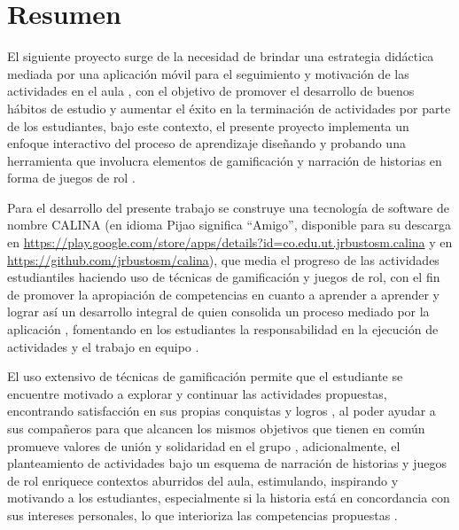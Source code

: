 \section*{Resumen}

\begin{singlespace}
El siguiente proyecto surge de la necesidad de brindar una estrategia didáctica mediada por una aplicación 
móvil para el seguimiento y motivación de las actividades en el aula \cite{SAILER2017371, DAROCHASEIXAS201648}, 
con el objetivo de promover el desarrollo de buenos hábitos de estudio y aumentar el éxito en la terminación 
de actividades por parte de los estudiantes, bajo este contexto, el presente proyecto implementa un enfoque 
interactivo del proceso de aprendizaje diseñando y probando una herramienta que involucra elementos de 
gamificación y narración de historias en forma de juegos de rol \cite{rauscher2021comics}.

Para el desarrollo del presente trabajo se construye una tecnología de software de nombre CALINA (en idioma 
Pijao significa ``Amigo'', disponible para su descarga en 
\url{https://play.google.com/store/apps/details?id=co.edu.ut.jrbustosm.calina} y en 
\url{https://github.com/jrbustosm/calina}), que media el progreso de las actividades estudiantiles haciendo 
uso de técnicas de gamificación y juegos de rol, con el fin de promover la apropiación de competencias en 
cuanto a aprender a aprender y lograr así un desarrollo integral de quien consolida un proceso mediado por la 
aplicación \cite{tornero2016ideas, molina_reconfiguracion_2021}, fomentando en los estudiantes la 
responsabilidad en la ejecución de actividades y el trabajo en equipo \cite{XU2017}.

El uso extensivo de técnicas de gamificación permite que el estudiante se encuentre motivado a explorar y 
continuar las actividades propuestas, encontrando satisfacción en sus propias conquistas y logros 
\cite{Danka2020, MULLINS2020304}, al poder ayudar a sus compañeros para que alcancen los mismos objetivos 
que tienen en común promueve valores de unión y solidaridad en el grupo \cite{DING20191}, adicionalmente, el 
planteamiento de actividades bajo un esquema de narración de historias y juegos de rol enriquece contextos 
aburridos del aula, estimulando, inspirando y motivando a los estudiantes, especialmente si la historia está en 
concordancia con sus intereses personales, lo que interioriza las competencias propuestas 
\cite{8190501, Young2015199}. 


\end{singlespace}
